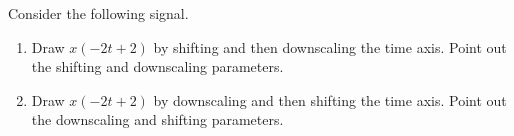 \documentclass[fleqn, a4paper, 11pt, oneside]{amsart}
\theoremstyle{definition}
\theoremstyle{theorem}
\begin{document}
\begin{question}
	Consider the following signal.
	\begin{figure}[H]
		\centering
	\end{figure}
	\begin{enumerate}
		\item
			Draw $x(-2 t + 2)$ by shifting and then downscaling the time axis.
			Point out the shifting and downscaling parameters.
		\item
			Draw $x(-2 t + 2)$ by downscaling and then shifting the time axis.
			Point out the downscaling and shifting parameters.
	\end{enumerate}
\end{question}
\end{document}
